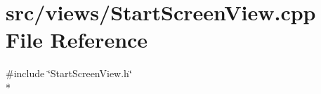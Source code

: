 \section{src/views/\-Start\-Screen\-View.cpp File Reference}
\label{_start_screen_view_8cpp}
{\ttfamily \#include \char`\"{}Start\-Screen\-View.\-h\char`\"{}}\\*
